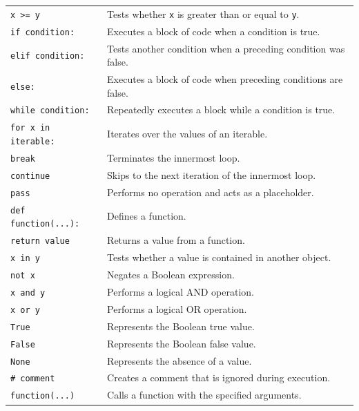\documentclass[11pt]{book}
\begin{document}
\begin{longtable}{p{} p{}}
    \texttt{x >= y} &
    Tests whether \texttt{x} is greater than or equal to \texttt{y}. \\

    \texttt{if condition:} &
    Executes a block of code when a condition is true. \\

    \texttt{elif condition:} &
    Tests another condition when a preceding condition was false. \\

    \texttt{else:} &
    Executes a block of code when preceding conditions are false. \\

    \texttt{while condition:} &
    Repeatedly executes a block while a condition is true. \\

    \texttt{for x in iterable:} &
    Iterates over the values of an iterable. \\

    \texttt{break} &
    Terminates the innermost loop. \\

    \texttt{continue} &
    Skips to the next iteration of the innermost loop. \\

    \texttt{pass} &
    Performs no operation and acts as a placeholder. \\

    \texttt{def function(...):} &
    Defines a function. \\

    \texttt{return value} &
    Returns a value from a function. \\

    \texttt{x in y} &
    Tests whether a value is contained in another object. \\

    \texttt{not x} &
    Negates a Boolean expression. \\

    \texttt{x and y} &
    Performs a logical AND operation. \\

    \texttt{x or y} &
    Performs a logical OR operation. \\

    \texttt{True} &
    Represents the Boolean true value. \\

    \texttt{False} &
    Represents the Boolean false value. \\

    \texttt{None} &
    Represents the absence of a value. \\

    \texttt{\# comment} &
    Creates a comment that is ignored during execution. \\

    \texttt{function(...)} &
    Calls a function with the specified arguments. \\

\end{longtable}
\end{document}
